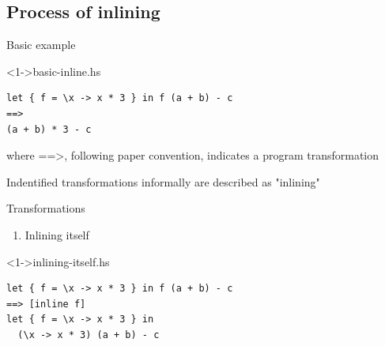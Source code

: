 \documentclass[hyperref={pdfpagelabels=false},xcolor={dvipsnames},compress,table,usenames,dvipsnames]{beamer}
\begin{document}
    \subsection{Process of inlining}

    \begin{frame}[fragile]{Basic example}
        \begin{exampleblock}
            <1->{basic-inline.hs}
            \begin{lstlisting}
let { f = \x -> x * 3 } in f (a + b) - c
==>
(a + b) * 3 - c
            \end{lstlisting}
        \end{exampleblock}
        where $\texttt{==>}$, following paper convention, indicates a program transformation
    \end{frame}


    \begin{frame}{Indentified transformations informally are described as "inlining"}
        \begin{enumerate}
        \end{enumerate}
    \end{frame}

    \begin{frame}[fragile]{Transformations}
        \begin{enumerate}
        \setcounter{enumi}{0}
        \item Inlining itself
        \end{enumerate}
        \begin{exampleblock}
            <1->{inlining-itself.hs}
            \begin{lstlisting}
let { f = \x -> x * 3 } in f (a + b) - c
==> [inline f]
let { f = \x -> x * 3 } in
  (\x -> x * 3) (a + b) - c
            \end{lstlisting}
        \end{exampleblock}
    \end{frame}
    
\end{document}
